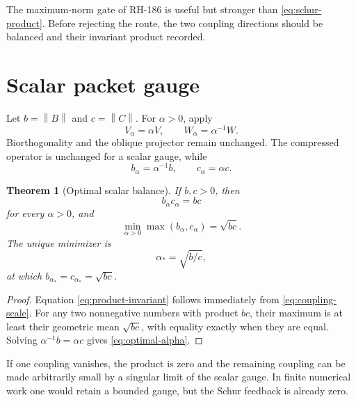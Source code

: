 \documentclass[12pt]{article}
\newtheorem{theorem}{Theorem}[section]
\theoremstyle{remark}
\newcommand{\norm}[1]{\left\lVert#1\right\rVert}
\begin{document}
The maximum-norm gate of RH-186 is useful but stronger than
\eqref{eq:schur-product}.  Before rejecting the route, the two coupling
directions should be balanced and their invariant product recorded.

\section{Scalar packet gauge}

Let $b=\norm B$ and $c=\norm C$.  For $\alpha>0$, apply
\begin{equation}\label{eq:scalar-gauge}
 V_\alpha=\alpha V,
 \qquad
 W_\alpha=\alpha^{-1}W.
\end{equation}
Biorthogonality and the oblique projector remain unchanged.  The compressed
operator is unchanged for a scalar gauge, while
\begin{equation}\label{eq:coupling-scale}
 b_\alpha=\alpha^{-1}b,
 \qquad
 c_\alpha=\alpha c.
\end{equation}

\begin{theorem}[Optimal scalar balance]\label{thm:balance}
If $b,c>0$, then
\begin{equation}\label{eq:product-invariant}
 b_\alpha c_\alpha=bc
\end{equation}
for every $\alpha>0$, and
\begin{equation}\label{eq:minimax}
 \min_{\alpha>0}\max(b_\alpha,c_\alpha)=\sqrt{bc}.
\end{equation}
The unique minimizer is
\begin{equation}\label{eq:optimal-alpha}
 \alpha_*=\sqrt{b/c},
\end{equation}
at which $b_{\alpha_*}=c_{\alpha_*}=\sqrt{bc}$.
\end{theorem}

\begin{proof}
Equation \eqref{eq:product-invariant} follows immediately from
\eqref{eq:coupling-scale}.  For any two nonnegative numbers with product
$bc$, their maximum is at least their geometric mean $\sqrt{bc}$, with
equality exactly when they are equal.  Solving
$\alpha^{-1}b=\alpha c$ gives \eqref{eq:optimal-alpha}.
\end{proof}

If one coupling vanishes, the product is zero and the remaining coupling can
be made arbitrarily small by a singular limit of the scalar gauge.  In
finite numerical work one would retain a bounded gauge, but the Schur
feedback is already zero.
\end{document}
